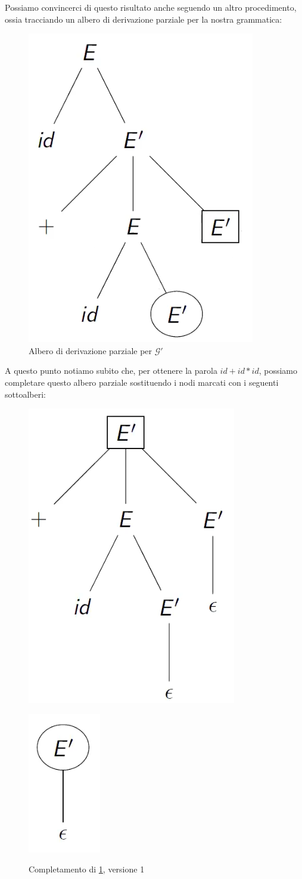 \documentclass[class=book, crop=false, oneside, 12pt]{standalone}
\begin{document}
Possiamo convincerci di questo risultato anche seguendo un altro procedimento, ossia tracciando un albero di derivazione parziale per la nostra grammatica:
\begin{figure}[H]
    \centering
    \includegraphics[width=.25\textwidth,keepaspectratio]{fxness-lrremove-ambiguity_1.png}
    \caption{Albero di derivazione parziale per \(\mathcal{G'}\)}
    \label{fxness-lrremove- ambiguity_1}
\end{figure}
A questo punto notiamo subito che, per ottenere la parola \(id + id * id\), possiamo completare questo albero parziale sostituendo i nodi marcati con i seguenti sottoalberi:
\begin{figure}[H]
    \begin{minipage}[b]{0.4\textwidth}
        \centering
        \includegraphics[width=.35\textwidth,keepaspectratio]{fxness-lrremove-ambiguity_2_1.png}
        \subcaption{}
        \label{fxness-lrremove- ambiguity_2_1}
    \end{minipage}
    \hfill
    \begin{minipage}[b]{0.4\textwidth}
        \centering
        \includegraphics[width=.15\textwidth,keepaspectratio]{fxness-lrremove-ambiguity_2_2.png}
        \subcaption{}
        \label{fxness-lrremove- ambiguity_2_2}
    \end{minipage}
    \caption{Completamento di \ref{fxness-lrremove- ambiguity_1}, versione 1}
    \label{fxness-lrremove- ambiguity_2}
\end{figure}
\end{document}
